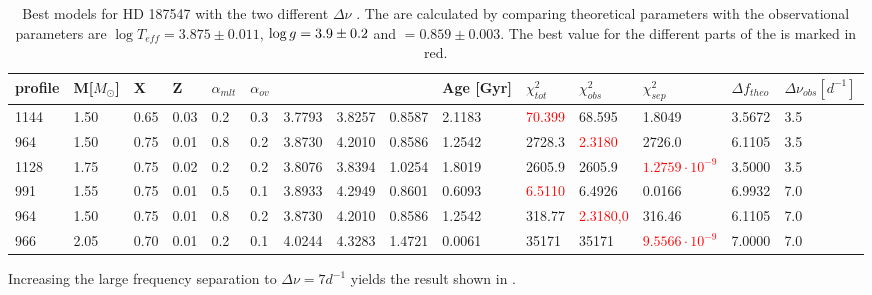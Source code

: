 
\begin{table}
	\caption{Best models for HD 187547 with the two different $\Delta \nu$ . The \chis are calculated by comparing theoretical parameters with the observational parameters are $\log T_{eff} = 3.875 \pm 0.011$, $\log g = 3.9 \pm 0.2 $ and \lum$=0.859 \pm 0.003$. The best \chis value for the different parts of the \chis is marked in red. }
	\label{bestchisuper}
	\begin{tabular}{lllllllllllllll}
		\toprule
		profile & M[$M_\odot$] & X & Z & $\alpha_{mlt}$ & $\alpha_{ov}$ & \teff & \logg & \lum & Age [Gyr]& $\chi_{tot}^2$ & $\chi_{obs}^2$ & $\chi_{sep}^2$ & $\Delta f_{theo}$&$\Delta\nu_{obs} [d^{-1}]$\\
		\midrule
		  1144  &  1.50  & 0.65   & 0.03   & 0.2   & 0.3  & 3.7793 & 3.8257  & 0.8587 &2.1183 & \textcolor{red}{70.399}  & 68.595  & 1.8049 & 3.5672 &3.5   \\
		  964  &  1.50  & 0.75   & 0.01    & 0.8   & 0.2  & 3.8730  & 4.2010  & 0.8586 &  1.2542 &  2728.3 & \textcolor{red}{2.3180}  &  2726.0 & 6.1105 &3.5    \\
	     1128  & 1.75    & 0.75  & 0.02     & 0.2  & 0.2  & 3.8076  & 3.8394 & 1.0254 & 1.8019 & 2605.9  & 2605.9  & \textcolor{red}{$1.2759 \cdot 10^{-9}$}& 3.5000  &  3.5  \\
		  991  &  1.55  &  0.75  & 0.01       & 0.5  & 0.1 &  3.8933  & 4.2949  & 0.8601  & 0.6093   &  \textcolor{red}{6.5110} & 6.4926  & 0.0166  & 6.9932 &7.0 \\
	      964 &  1.50  & 0.75  & 0.01      & 0.8  & 0.2  &  3.8730 & 4.2010   & 0.8586 & 1.2542  &  318.77 &  \textcolor{red}{2.3180,0} &  316.46 &
	      6.1105 &7.0 \\
		  966 &  2.05 & 0.70  & 0.01      & 0.2  & 0.1  &  4.0244 & 4.3283 & 1.4721 &  0.0061   &  35171  & 35171 &   \textcolor{red}{$9.5566 \cdot 10^{-9}$}  & 7.0000 &7.0     \\         
		 \bottomrule
	\end{tabular}

\end{table}
Increasing the large frequency separation to $\Delta \nu = 7d^{-1}$ yields the result shown in .

